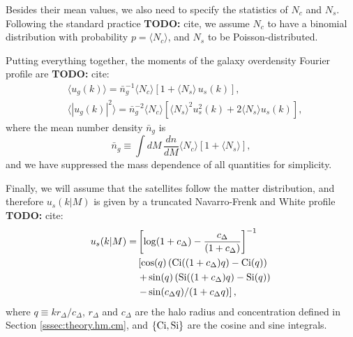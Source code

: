 \documentclass[useAMS,usenatbib]{mn2e}
\newcommand{\TODO}[1]{{\bf TODO:} #1}
\begin{document}
      Besides their mean values, we also need to specify the statistics of $N_c$ and $N_s$. Following the standard practice \TODO{cite}, we assume $N_c$ to have a binomial distribution with probability $p=\langle N_c\rangle$, and $N_s$ to be Poisson-distributed.

      Putting everything together, the moments of the galaxy overdensity Fourier profile are \TODO{cite}:
      \begin{align}
        &\langle u_g(k)\rangle=\bar{n}_g^{-1}\langle N_c\rangle\left[1+\langle N_s\rangle\,u_s(k)\right],\\
        &\langle |u_g(k)|^2\rangle=\bar{n}_g^{-2}\langle N_c\rangle\left[\langle N_s\rangle^2u_s^2(k)+2\langle N_s\rangle u_s(k)\right],
      \end{align}
      where the mean number density $\bar{n}_g$ is
      \begin{equation}
        \bar{n}_g\equiv\int dM\,\frac{dn}{dM}\langle N_c\rangle\left[1+\langle N_s\rangle\right],
      \end{equation} 
      and we have suppressed the mass dependence of all quantities for simplicity.

      Finally, we will assume that the satellites follow the matter distribution, and therefore $u_s(k|M)$ is given by a truncated Navarro-Frenk and White profile \TODO{cite}:
      \begin{align}
        u_s(k|M)=&\left[\log(1+c_\Delta)-\frac{c_\Delta}{(1+c_\Delta)}\right]^{-1}\\
               &\left[\cos(q)\left({\rm Ci}((1+c_\Delta)q)-{\rm Ci}(q)\right)\right.\\\nonumber
               &\left.+\sin(q)\left({\rm Si}((1+c_\Delta)q)-{\rm Si}(q)\right)\right.\\&\left.-\sin(c_\Delta q)/(1+c_\Delta q)\right],
      \end{align}
      where $q\equiv kr_\Delta/c_\Delta$, $r_\Delta$ and $c_\Delta$ are the halo radius and concentration defined in Section \ref{sssec:theory.hm.cm}, and $\{{\rm Ci}, {\rm Si}\}$ are the cosine and sine integrals.
      
\end{document}
